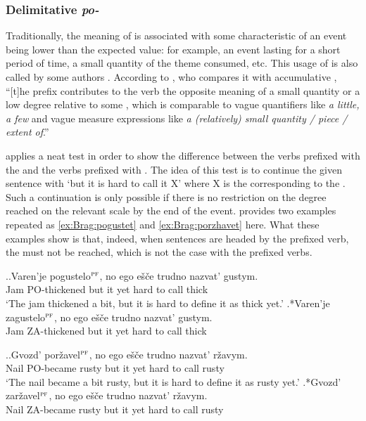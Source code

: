 \subsubsection{Delimitative \textit{po-}}
Traditionally, the  meaning of  is associated with some characteristic of an event being lower than the expected value: for example, an event lasting for a short period of time, a small quantity of the theme consumed, etc. This usage of  is also called  by some authors \citep[e.g.][]{Svenonius:04b}. According to \citet[47--48]{Filip:00}, who compares it with accumulative , ``[t]he prefix  contributes to the verb the opposite meaning of a small quantity or a low degree relative to some , which is comparable to vague quantifiers like \textit{a little, a few} and vague measure expressions like \textit{a (relatively) small quantity / piece / extent of}.''

\citet[183]{Braginsky:08} applies a neat test in order to show the difference between the verbs prefixed with the   and the verbs prefixed with . The idea of this test is to continue the given sentence with `but it is hard to call it X' where X is the  corresponding to the . Such a continuation is only possible if there is no restriction on the degree reached on the relevant scale by the end of the event. \citet[183]{Braginsky:08} provides two examples repeated as \ref{ex:Brag:pogustet} and \ref{ex:Brag:porzhavet} here. What these examples show is that, indeed, when sentences are headed by the prefixed verb, the  must not be reached, which is not the case with the prefixed  verbs.

\ex.\label{ex:Brag:pogustet}\ag.Varen'je pogustelo$^{\textsc{pf}}$, no ego e\v{s}\v{c}e trudno nazvat' gustym.\\
Jam PO-thickened but it yet hard {to call} thick\\
\trans `The jam thickened a bit, but it is hard to define it as thick yet.'
\bg.*Varen'je zagustelo$^{\textsc{pf}}$, no ego e\v{s}\v{c}e trudno nazvat' gustym.\\
Jam ZA-thickened but it yet hard {to call} thick\\

\ex.\label{ex:Brag:porzhavet}\ag.Gvozd' por\v{z}avel$^{\textsc{pf}}$, no ego e\v{s}\v{c}e trudno nazvat' r\v{z}avym.\\
Nail {PO-became rusty} but it yet hard {to call} rusty\\
\trans `The nail became a bit rusty, but it is hard to define it as rusty yet.'
\bg.*Gvozd' zar\v{z}avel$^{\textsc{pf}}$, no ego e\v{s}\v{c}e trudno nazvat' r\v{z}avym.\\
Nail {ZA-became rusty} but it yet hard {to call} rusty\\


